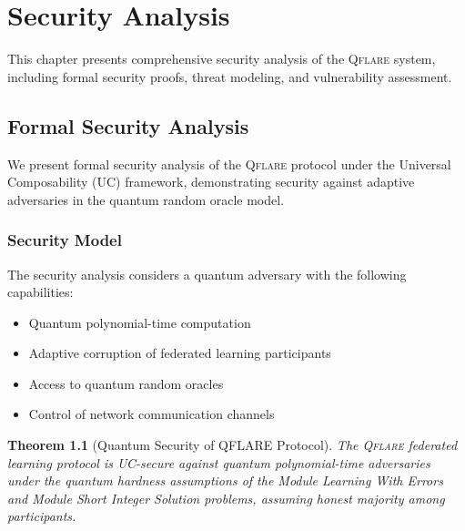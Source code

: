 ﻿\documentclass[12pt,a4paper,twoside]{book}
\newcommand{\qflare}{\textsc{Qflare}}
\newtheorem{theorem}{Theorem}[chapter]
\begin{document}
\chapter{Security Analysis}
\label{ch:security-analysis}

This chapter presents comprehensive security analysis of the \qflare{} system, including formal security proofs, threat modeling, and vulnerability assessment.

\section{Formal Security Analysis}
\label{sec:formal-security}

We present formal security analysis of the \qflare{} protocol under the Universal Composability (UC) framework, demonstrating security against adaptive adversaries in the quantum random oracle model.

\subsection{Security Model}
\label{subsec:security-model}

The security analysis considers a quantum adversary with the following capabilities:

\begin{itemize}
\item Quantum polynomial-time computation
\item Adaptive corruption of federated learning participants
\item Access to quantum random oracles
\item Control of network communication channels
\end{itemize}

\begin{theorem}[Quantum Security of QFLARE Protocol]
\label{thm:qflare-security}
The \qflare{} federated learning protocol is UC-secure against quantum polynomial-time adversaries under the quantum hardness assumptions of the Module Learning With Errors and Module Short Integer Solution problems, assuming honest majority among participants.
\end{theorem}
\end{document}
